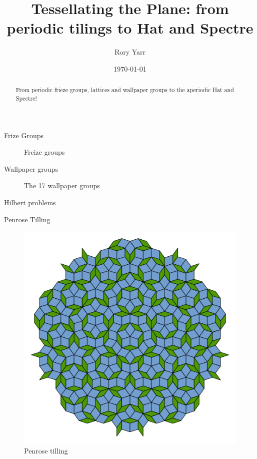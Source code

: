 \documentclass{beamer}
\title[Tilling the Plane]{Tessellating the Plane: from periodic tilings to Hat and Spectre}
\author{Rory Yarr}
\date{\today}
\theoremstyle{definition}
\begin{document}
\begin{frame}
  \titlepage

  \begin{abstract}
    From periodic frieze groups, lattices and wallpaper groups to the aperiodic Hat and Spectre!
  \end{abstract}
\end{frame}

\begin{frame}{Frize Groups}
    \begin{figure}
        \centering
        
        \caption{Freize groups}
        \label{fig:Freize}
    \end{figure}
\end{frame}

%         


\begin{frame}{Wallpaper groups}
    \begin{figure}
        \centering
        \caption{The 17 wallpaper groups \cite{Clark1}}
        \label{fig:17WallpaperGroups}
    \end{figure}
\end{frame}


\begin{frame}{Hilbert problems}
    
\end{frame}

\begin{frame}{Penrose Tilling}
    \begin{figure}
        \centering
        \includegraphics[width=0.5\linewidth]{Pictures/Penrose_Tiling_(Rhombi).svg}
        \caption{Penrose tilling}
        \label{fig:penrose-rhombi}
    \end{figure}
\end{frame}
\end{document}
